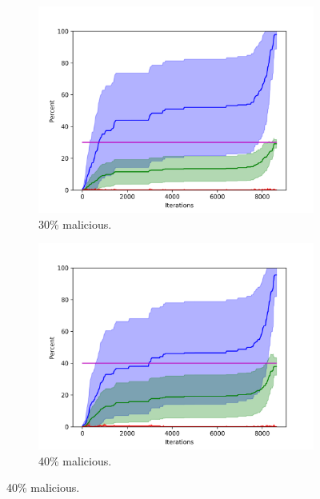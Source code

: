 \begin{figure}

\begin{subfigure}{0.5\textwidth}
\includegraphics[width=\linewidth]{images/plots/Network_rA/10_30.png}
\caption{30\% malicious.}
\end{subfigure}
\hspace*{\fill} %
\begin{subfigure}{0.5\textwidth}
\includegraphics[width=\linewidth]{images/plots/Network_rA/10_40.png}
\caption{40\% malicious.}
\end{subfigure}


\end{figure}

